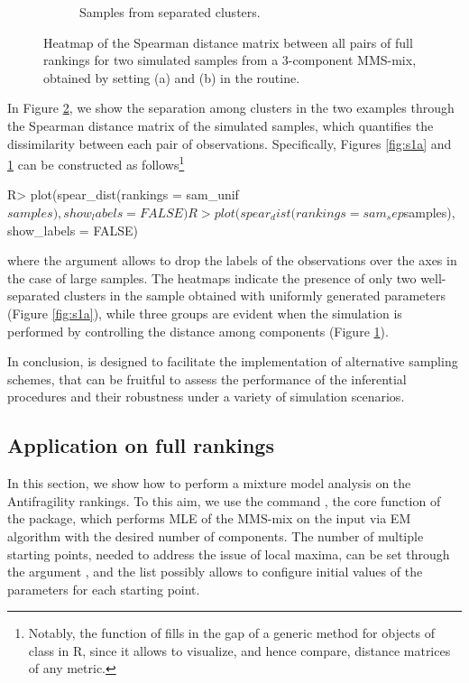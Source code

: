 \begin{figure}[t]
\begin{subfigure}[b]{0.49\textwidth}
         \caption{{Samples from separated clusters.}}
         \label{fig:s1b}
     \end{subfigure}
        \caption{{Heatmap of the Spearman distance matrix between all pairs of full rankings for two simulated samples from a 3-component MMS-mix, obtained by setting  (a) and  (b) in the  routine.}}
        \label{fig:s1}
\end{figure}
In Figure \ref{fig:s1}, we show the separation among clusters in the two examples through the Spearman distance matrix of the simulated samples, which quantifies the dissimilarity between each pair of observations. Specifically, Figures \ref{fig:s1a} and \ref{fig:s1b} can be constructed as follows\footnote{Notably, the  function of  fills in the gap of a generic method for objects of class  in \textsf{R}, since it allows to visualize, and hence compare, distance matrices of any metric.}
\begin{example}
R> plot(spear_dist(rankings = sam_unif$samples), show_labels = FALSE)
R> plot(spear_dist(rankings = sam_sep$samples), show_labels = FALSE)
\end{example}
{where the argument  allows to drop the labels of the observations over the axes in the case of large samples.}
{The heatmaps indicate} the presence of only two well-separated clusters in the sample {obtained with uniformly generated parameters (Figure \ref{fig:s1a})}, while three groups are evident {when the simulation is performed by controlling the distance among components (Figure \ref{fig:s1b}).} 

In conclusion,  is designed to facilitate the implementation of alternative sampling schemes, that can be fruitful to assess the performance of the inferential procedures and their robustness under a variety of simulation scenarios.


\subsection{Application on full rankings}
\label{subsec:est_full}
In this section, we show how to perform a mixture model analysis on the Antifragility rankings.
To this aim, we use the command , the core function of the  package, which performs MLE of the MMS-mix on the input  via EM algorithm with the desired number  of components. The number of multiple starting points, needed to address the issue of local maxima, can be set through the argument , and the list  possibly allows to configure initial values of the parameters for each starting point. 

